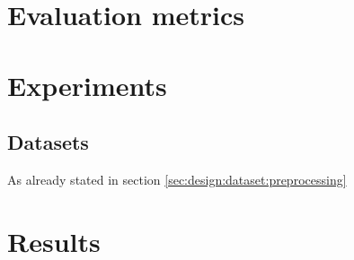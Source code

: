 





\section{Evaluation metrics}
\label{sec:imp:eval}


\section{Experiments}
\label{sec:imp:experiments}

\subsection{Datasets}
\label{sec:imp:experiments:ds}
As already stated in section \ref{sec:design:dataset:preprocessing}



\section{Results}
\label{sec:imp:results}
